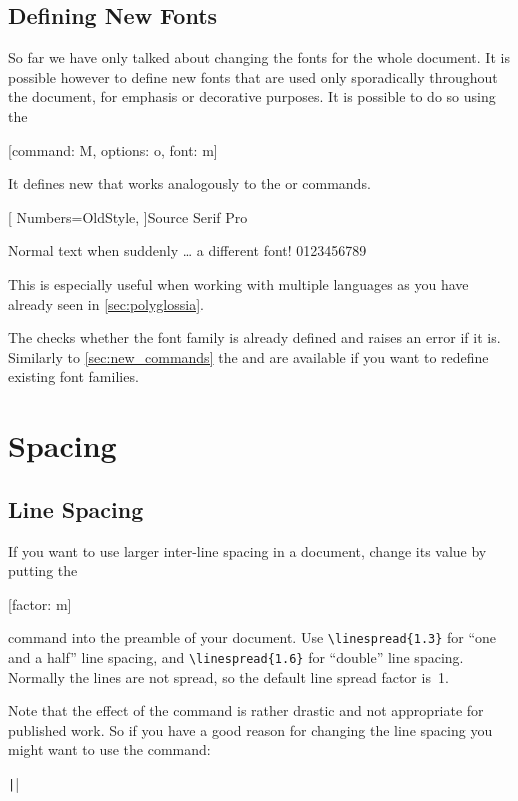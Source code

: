 \subsection{Defining New Fonts}

So far we have only talked about changing the fonts for the whole document. It
is possible however to define new fonts that are used only sporadically
throughout the document, for emphasis or decorative purposes. It is possible to
do so using the
\begin{lscommand}
  [command: M, options: o, font: m]
\end{lscommand}
It defines new  that works analogously to the  or
 commands.
\begin{example}
\newfontfamily{\sourcefamily}[
  Numbers=OldStyle,
]{Source Serif Pro}

Normal text when suddenly
\ldots{} \sourcefamily
a different font! 0123456789
\end{example}
This is especially useful when working with multiple languages as you have
already seen in \autoref{sec:polyglossia}.

The  checks whether the font family is already defined and
raises an error if it is. Similarly to \autoref{sec:new_commands} the
 and  are available if you want to
redefine existing font families.

\section{Spacing}

\subsection{Line Spacing}

If you want to use larger inter-line spacing in a
document, change its value by putting the
\begin{lscommand}
  [factor: m]
\end{lscommand}
command into the preamble of your document.
Use \verb|\linespread{1.3}| for ``one and a half'' line
spacing, and \verb|\linespread{1.6}| for ``double'' line spacing.  Normally
the lines are not spread, so the default line spread factor
is~1.

Note that the effect of the  command is rather drastic and
not appropriate for published work. So if you have a good reason for
changing the line spacing you might want to use the command:
\begin{lscommand}
  \texttt|\setlength{\baselineskip}{1.5\baselineskip}|
\end{lscommand}

